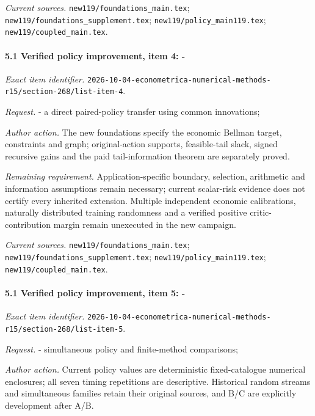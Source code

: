 \par\emph{Current sources.} \nolinkurl{new119/foundations_main.tex}; \nolinkurl{new119/foundations_supplement.tex}; \nolinkurl{new119/policy_main119.tex}; \nolinkurl{new119/coupled_main.tex}.

\paragraph{5.1 Verified policy improvement, item 4: -}

\emph{Exact item identifier.} \nolinkurl{2026-10-04-econometrica-numerical-methods-r15/section-268/list-item-4}.

\par\emph{Request.} - a direct paired-policy transfer using common innovations;

\par\emph{Author action.} The new foundations specify the economic Bellman target, constraints and graph; original-action supports, feasible-tail slack, signed recursive gains and the paid tail-information theorem are separately proved.

\par\emph{Remaining requirement.} Application-specific boundary, selection, arithmetic and information assumptions remain necessary; current scalar-risk evidence does not certify every inherited extension. Multiple independent economic calibrations, naturally distributed training randomness and a verified positive critic-contribution margin remain unexecuted in the new campaign.

\par\emph{Current sources.} \nolinkurl{new119/foundations_main.tex}; \nolinkurl{new119/foundations_supplement.tex}; \nolinkurl{new119/policy_main119.tex}; \nolinkurl{new119/coupled_main.tex}.

\paragraph{5.1 Verified policy improvement, item 5: -}

\emph{Exact item identifier.} \nolinkurl{2026-10-04-econometrica-numerical-methods-r15/section-268/list-item-5}.

\par\emph{Request.} - simultaneous policy and finite-method comparisons;

\par\emph{Author action.} Current policy values are deterministic fixed-catalogue numerical enclosures; all seven timing repetitions are descriptive. Historical random streams and simultaneous families retain their original sources, and B/\allowbreak{}C are explicitly development after A/\allowbreak{}B.

